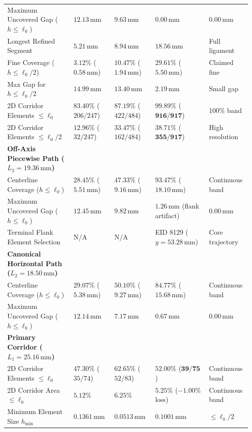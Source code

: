 \begin{table}[htbp]
\begin{tabularx}{\textwidth}{p{3.8cm}XXXX}
Maximum Uncovered Gap ($h \le \ell_0$) & $12.13\,\mathrm{mm}$ & $9.63\,\mathrm{mm}$ & $\mathbf{0.00\,\mathrm{mm}}$ & $0.00\,\mathrm{mm}$ \\
Longest Refined Segment & $5.21\,\mathrm{mm}$ & $8.94\,\mathrm{mm}$ & $\mathbf{18.56\,\mathrm{mm}}$ & Full ligament \\
Fine Coverage ($h \le \ell_0/2$) & $3.12\%$ ($0.58\,\mathrm{mm}$) & $10.47\%$ ($1.94\,\mathrm{mm}$) & $\mathbf{29.61\%}$ ($\mathbf{5.50\,\mathrm{mm}}$) & Claimed fine \\
Max Gap for $h \le \ell_0/2$ & $14.99\,\mathrm{mm}$ & $13.40\,\mathrm{mm}$ & $\mathbf{2.19\,\mathrm{mm}}$ & Small gap \\
2D Corridor Elements $\le \ell_0$ & $83.40\%$ ($206/247$) & $87.19\%$ ($422/484$) & $\mathbf{99.89\%}$ ($\mathbf{916/917}$) & 100\% band \\
2D Corridor Elements $\le \ell_0/2$ & $12.96\%$ ($32/247$) & $33.47\%$ ($162/484$) & $\mathbf{38.71\%}$ ($\mathbf{355/917}$) & High resolution \\
\hline
\textbf{Off-Axis Piecewise Path ($L_2 = 19.36\,\mathrm{mm}$)} & & & & \\
Centerline Coverage ($h \le \ell_0$) & $28.45\%$ ($5.51\,\mathrm{mm}$) & $47.33\%$ ($9.16\,\mathrm{mm}$) & $\mathbf{93.47\%}$ ($\mathbf{18.10\,\mathrm{mm}}$) & Continuous band \\
Maximum Uncovered Gap ($h \le \ell_0$) & $12.45\,\mathrm{mm}$ & $9.82\,\mathrm{mm}$ & $\mathbf{1.26\,\mathrm{mm}}$ (flank artifact) & $0.00\,\mathrm{mm}$ \\
Terminal Flank Element Selection & N/A & N/A & EID 8129 ($y=53.28\,\mathrm{mm}$) & Core trajectory \\
\hline
\textbf{Canonical Horizontal Path ($L_2 = 18.50\,\mathrm{mm}$)} & & & & \\
Centerline Coverage ($h \le \ell_0$) & $29.07\%$ ($5.38\,\mathrm{mm}$) & $50.10\%$ ($9.27\,\mathrm{mm}$) & $\mathbf{84.77\%}$ ($\mathbf{15.68\,\mathrm{mm}}$) & Continuous band \\
Maximum Uncovered Gap ($h \le \ell_0$) & $12.14\,\mathrm{mm}$ & $7.17\,\mathrm{mm}$ & $\mathbf{0.67\,\mathrm{mm}}$ & $0.00\,\mathrm{mm}$ \\
\hline
\textbf{Primary Corridor ($L_1 = 25.16\,\mathrm{mm}$)} & & & & \\
2D Corridor Elements $\le \ell_0$ & $47.30\%$ ($35/74$) & $62.65\%$ ($52/83$) & $\mathbf{52.00\%}$ ($\mathbf{39/75}$) & Continuous band \\
2D Corridor Area $\le \ell_0$ & $5.12\%$ & $6.25\%$ & $\mathbf{5.25\%}$ ($-1.00\%$ loss) & Continuous band \\
Minimum Element Size $h_{\min}$ & $0.1361\,\mathrm{mm}$ & $0.0513\,\mathrm{mm}$ & $\mathbf{0.1001\,\mathrm{mm}}$ & $\le \ell_0/2$ \\
\hline
\end{tabularx}
\end{table}

